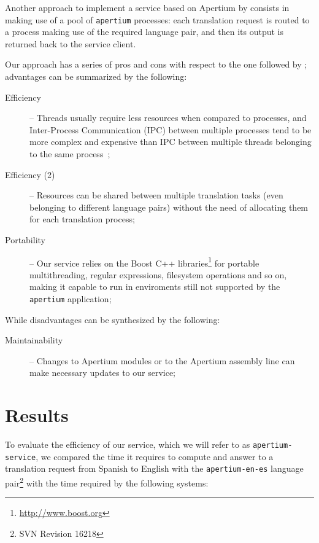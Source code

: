 \documentclass[11pt]{article}
\begin{document}
Another approach to implement a service based on Apertium by \cite{sanchez-cartagena2009scalable} consists in making use of a pool of {\tt\small apertium} processes: each translation request is routed to a process making use of the required language pair, and then its output is returned back to the service client.

Our approach has a series of pros and cons with respect to the one followed by \cite{sanchez-cartagena2009scalable}; advantages can be summarized by the following:

\begin{description}
 \item[Efficiency] -- Threads usually require less resources when compared to processes, and Inter-Process Communication (IPC) between multiple processes tend to be more complex and expensive than IPC between multiple threads belonging to the same process~\citep{tanenbaum};
 \item[Efficiency (2)] -- Resources can be shared between multiple translation tasks (even belonging to different language pairs) without the need of allocating them for each translation process;
 \item[Portability] -- Our service relies on the Boost C++ libraries\footnote{\url{http://www.boost.org}} for portable multithreading, regular expressions, filesystem operations and so on, making it capable to run in enviroments still not supported by the {\tt\small apertium} application;
\end{description}

While disadvantages can be synthesized by the following:

\begin{description}
 \item[Maintainability] -- Changes to Apertium modules or to the Apertium assembly line can make necessary updates to our service;
\end{description}


\section{Results}

To evaluate the efficiency of our service, which we will refer to as {\tt\small apertium-service}, we compared the time it requires to compute and answer to a translation request from Spanish to English with the {\tt\small apertium-en-es} language pair\footnote{SVN Revision 16218} with the time required by the following systems:
\end{document}
